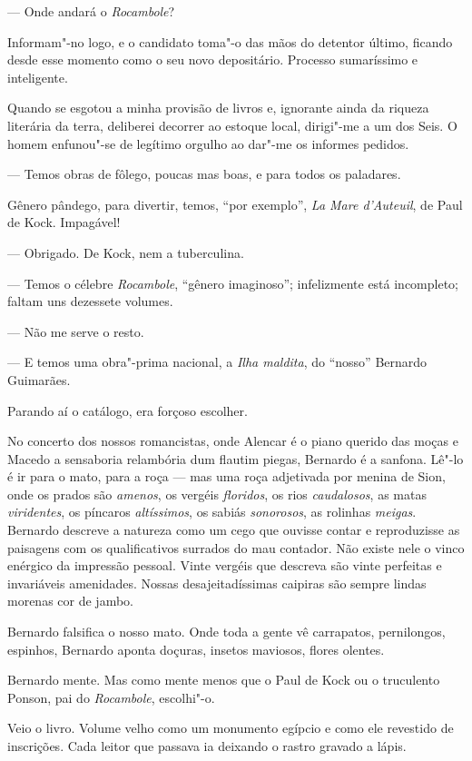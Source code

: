 --- Onde andará o \emph{Rocambole}?

Informam"-no logo, e o candidato toma"-o das mãos do detentor último,
ficando desde esse momento como o seu novo depositário. Processo
sumaríssimo e inteligente.

Quando se esgotou a minha provisão de livros e, ignorante ainda da
riqueza literária da terra, deliberei decorrer ao estoque local,
dirigi"-me a um dos Seis. O homem enfunou"-se de legítimo orgulho ao
dar"-me os informes pedidos.

--- Temos obras de fôlego, poucas mas boas, e para todos os paladares.

Gênero pândego, para divertir, temos, ``por exemplo'', \emph{La Mare
d'Auteuil}, de Paul de Kock. Impagável!

--- Obrigado. De Kock, nem a tuberculina.

--- Temos o célebre \emph{Rocambole}, ``gênero imaginoso''; infelizmente
está incompleto; faltam uns dezessete volumes.

--- Não me serve o resto.

--- E temos uma obra"-prima nacional, a \emph{Ilha maldita}, do ``nosso''
Bernardo Guimarães.

Parando aí o catálogo, era forçoso escolher.

No concerto dos nossos romancistas, onde Alencar é o piano querido das
moças e Macedo a sensaboria relambória dum flautim piegas, Bernardo é a
sanfona. Lê"-lo é ir para o mato, para a roça --- mas uma roça adjetivada
por menina de Sion, onde os prados são \emph{amenos}, os vergéis
\emph{floridos}, os rios \emph{caudalosos}, as matas \emph{viridentes},
os píncaros \emph{altíssimos}, os sabiás \emph{sonorosos}, as rolinhas
\emph{meigas}. Bernardo descreve a natureza como um cego que ouvisse
contar e reproduzisse as paisagens com os qualificativos surrados do mau
contador. Não existe nele o vinco enérgico da impressão pessoal. Vinte
vergéis que descreva são vinte perfeitas e invariáveis amenidades.
Nossas desajeitadíssimas caipiras são sempre lindas morenas cor de
jambo.

Bernardo falsifica o nosso mato. Onde toda a gente vê carrapatos,
pernilongos, espinhos, Bernardo aponta doçuras, insetos maviosos, flores
olentes.

Bernardo mente. Mas como mente menos que o Paul de Kock ou o truculento
Ponson, pai do \emph{Rocambole}, escolhi"-o.

Veio o livro. Volume velho como um monumento egípcio e como ele
revestido de inscrições. Cada leitor que passava ia deixando o rastro
gravado a lápis.

